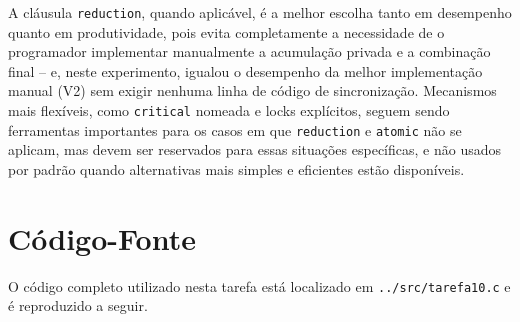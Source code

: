 \documentclass[a4paper,12pt]{article}
\begin{document}
A cláusula \texttt{reduction}, quando aplicável, é a melhor escolha
tanto em desempenho quanto em produtividade, pois evita completamente
a necessidade de o programador implementar manualmente a
acumulação privada e a combinação final -- e, neste experimento,
igualou o desempenho da melhor implementação manual (V2) sem exigir
nenhuma linha de código de sincronização. Mecanismos mais
flexíveis, como \texttt{critical} nomeada e locks explícitos, seguem
sendo ferramentas importantes para os casos em que \texttt{reduction}
e \texttt{atomic} não se aplicam, mas devem ser reservados para essas
situações específicas, e não usados por padrão quando alternativas
mais simples e eficientes estão disponíveis.

\newpage

\appendix
\section{Código-Fonte}

O código completo utilizado nesta tarefa está localizado em
\texttt{../src/tarefa10.c} e é reproduzido a seguir.


\end{document}
